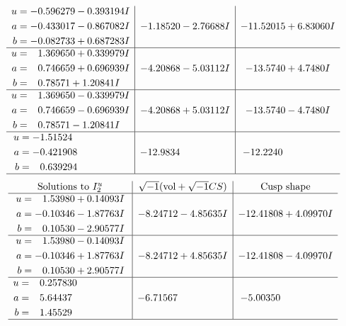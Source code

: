\documentclass[1p]{elsarticle_modified}
\theoremstyle{definition}
\newcommand{\I}{\sqrt{-1}}
\begin{document}
$$\begin{array}{c|c|c}
\begin{aligned}
u &= -0.596279 - 0.393194 I \\
a &= -0.433017 - 0.867082 I \\
b &= -0.082733 + 0.687283 I\end{aligned}
 & -1.18520 - 2.76688 I & -11.52015 + 6.83060 I \\ \hline\begin{aligned}
u &= \phantom{-}1.369650 + 0.339979 I \\
a &= \phantom{-}0.746659 + 0.696939 I \\
b &= \phantom{-}0.78571 + 1.20841 I\end{aligned}
 & -4.20868 - 5.03112 I & -13.5740 + 4.7480 I \\ \hline\begin{aligned}
u &= \phantom{-}1.369650 - 0.339979 I \\
a &= \phantom{-}0.746659 - 0.696939 I \\
b &= \phantom{-}0.78571 - 1.20841 I\end{aligned}
 & -4.20868 + 5.03112 I & -13.5740 - 4.7480 I \\ \hline\begin{aligned}
u &= -1.51524\phantom{ +0.000000I} \\
a &= -0.421908\phantom{ +0.000000I} \\
b &= \phantom{-}0.639294\phantom{ +0.000000I}\end{aligned}
 & -12.9834\phantom{ +0.000000I} & -12.2240\phantom{ +0.000000I}\\
 \hline 
 \end{array}$$\newpage$$\begin{array}{c|c|c}  
\text{Solutions to }I^u_{2}& \I (\text{vol} + \sqrt{-1}CS) & \text{Cusp shape}\\
 \hline 
\begin{aligned}
u &= \phantom{-}1.53980 + 0.14093 I \\
a &= -0.10346 - 1.87763 I \\
b &= \phantom{-}0.10530 - 2.90577 I\end{aligned}
 & -8.24712 - 4.85635 I & -12.41808 + 4.09970 I \\ \hline\begin{aligned}
u &= \phantom{-}1.53980 - 0.14093 I \\
a &= -0.10346 + 1.87763 I \\
b &= \phantom{-}0.10530 + 2.90577 I\end{aligned}
 & -8.24712 + 4.85635 I & -12.41808 - 4.09970 I \\ \hline\begin{aligned}
u &= \phantom{-}0.257830\phantom{ +0.000000I} \\
a &= \phantom{-}5.64437\phantom{ +0.000000I} \\
b &= \phantom{-}1.45529\phantom{ +0.000000I}\end{aligned}
 & -6.71567\phantom{ +0.000000I} & -5.00350\phantom{ +0.000000I}\\
 \hline 
 \end{array}$$\newpage\newpage\renewcommand{\arraystretch}{1}
\end{document}
